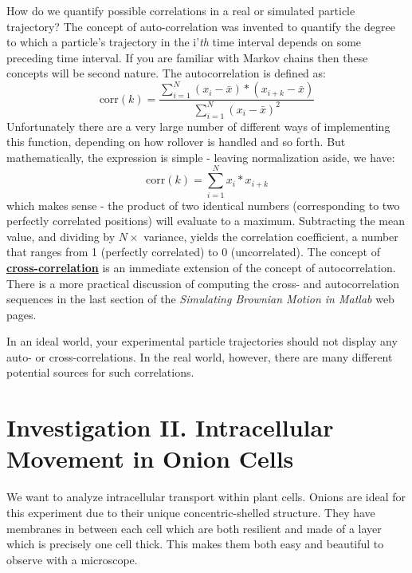 \documentclass{../lab}
\begin{document}
How do we quantify possible correlations in a real or simulated particle trajectory? The concept of auto-correlation was invented to quantify the degree to which a particle's trajectory in the i'\emph{th} time interval depends on some preceding time interval. If you are familiar with Markov chains then these concepts will be second nature. The autocorrelation is defined as:
\begin{equation}
    \textrm{corr}(k) = \frac{\sum_{i=1}^N(x_i-\bar{x})*(x_{i+k}-\bar{x})}{\sum_{i=1}^N(x_i-\bar{x})^2}
\end{equation}
Unfortunately there are a very large number of different ways of implementing this function, depending on how rollover is handled and so forth. But mathematically, the expression is simple - leaving normalization aside, we have:
\begin{equation}
    \textrm{corr}(k) = \sum_{i=1}^N x_i*x_{i+k}
\end{equation}
which makes sense - the product of two identical numbers (corresponding to two perfectly correlated positions) will evaluate to a maximum. Subtracting the mean value, and dividing by $N \times$ variance, yields the correlation coefficient, a number that ranges from 1 (perfectly correlated) to 0 (uncorrelated). The concept of \href{http://physics111.lib.berkeley.edu/Physics111/Reprints/OTZ/biowikipedia.pdf}{\textbf{cross-correlation}} is an immediate extension of the concept of autocorrelation. There is a more practical discussion of computing the cross- and autocorrelation sequences in the last section of the \emph{Simulating Brownian Motion in Matlab }web pages.

In an ideal world, your experimental particle trajectories should not display any auto- or cross-correlations. In the real world, however, there are many different potential sources for such correlations.

\section{Investigation II. Intracellular Movement in Onion Cells}
\label{sec:InvestigationII}

We want to analyze intracellular transport within plant cells. Onions are ideal for this experiment due to their unique concentric-shelled structure. They have membranes in between each cell which are both resilient and made of a layer which is precisely one cell thick. This makes them both easy and beautiful to observe with a microscope.
\end{document}
